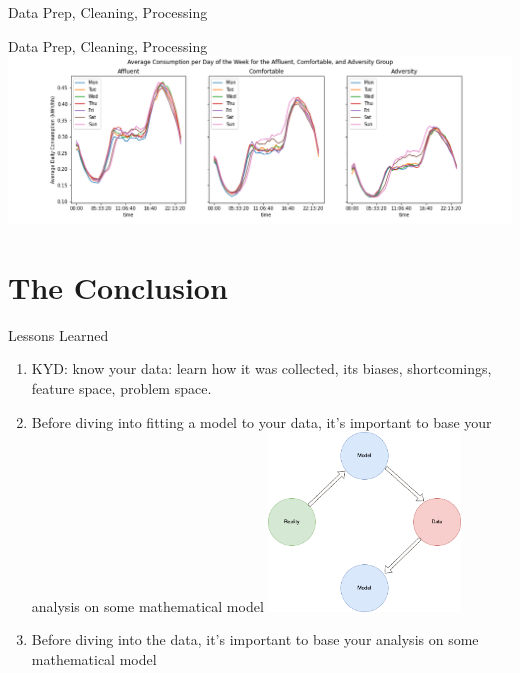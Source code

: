 \documentclass{beamer}
\begin{document}
\begin{frame}{Data Prep, Cleaning, Processing}

\end{frame}

\begin{frame}{Data Prep, Cleaning, Processing}
  \centering
  \includegraphics[width=1.1\textwidth]{images/dow-socio.png}
\end{frame}

\section{The Conclusion}

\begin{frame}{Lessons Learned}
  \begin{enumerate}
    \item<+-> KYD: know your data: learn how it was collected, its biases, shortcomings, feature space, problem space.
    \item<+-> Before diving into fitting a model to your data, it's important to base your analysis on some mathematical model
    \centering
    \includegraphics[width=0.4\textwidth]{images/reality-model-data.png}
    \item<+-> Before diving into the data, it's important to base your analysis on some mathematical model
  \end{enumerate}
\end{frame}
\end{document}
